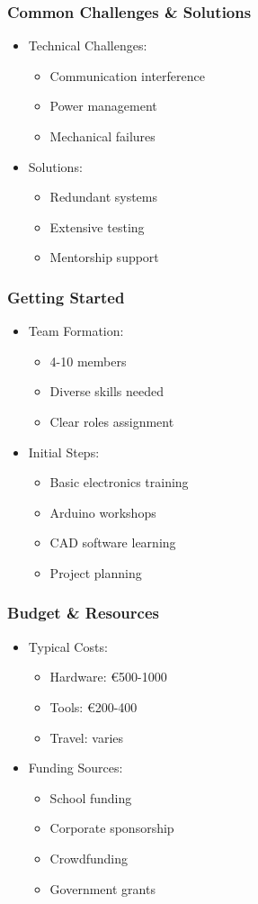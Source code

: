 \documentclass{beamer}
\begin{document}
\begin{frame}
\frametitle{Common Challenges \& Solutions}
\begin{itemize}
\item Technical Challenges:
    \begin{itemize}
    \item Communication interference
    \item Power management
    \item Mechanical failures
    \end{itemize}
\item Solutions:
    \begin{itemize}
    \item Redundant systems
    \item Extensive testing
    \item Mentorship support
    \end{itemize}
\end{itemize}
\end{frame}

\begin{frame}
\frametitle{Getting Started}
\begin{itemize}
\item Team Formation:
    \begin{itemize}
    \item 4-10 members
    \item Diverse skills needed
    \item Clear roles assignment
    \end{itemize}
\item Initial Steps:
    \begin{itemize}
    \item Basic electronics training
    \item Arduino workshops
    \item CAD software learning
    \item Project planning
    \end{itemize}
\end{itemize}
\end{frame}

\begin{frame}
\frametitle{Budget \& Resources}
\begin{itemize}
\item Typical Costs:
    \begin{itemize}
    \item Hardware: €500-1000
    \item Tools: €200-400
    \item Travel: varies
    \end{itemize}
\item Funding Sources:
    \begin{itemize}
    \item School funding
    \item Corporate sponsorship
    \item Crowdfunding
    \item Government grants
    \end{itemize}
\end{itemize}
\end{frame}
\end{document}
